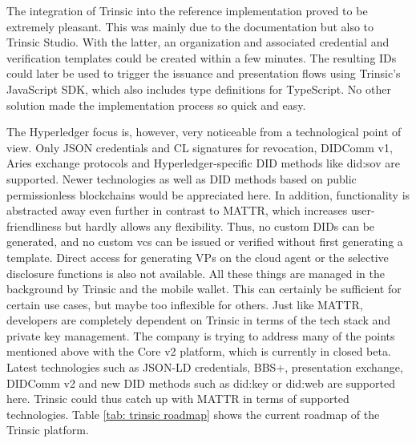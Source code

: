     The integration of Trinsic into the reference implementation proved to be extremely pleasant. This was mainly due to the documentation but also to Trinsic Studio. With the latter, an organization and associated credential and verification templates could be created within a few minutes. The resulting IDs could later be used to trigger the issuance and presentation flows using Trinsic's JavaScript SDK, which also includes type definitions for TypeScript. No other solution made the implementation process so quick and easy.
    
    The Hyperledger focus is, however, very noticeable from a technological point of view. Only JSON credentials and CL signatures for revocation, DIDComm v1, Aries exchange protocols and Hyperledger-specific DID methods like did:sov are supported. Newer technologies as well as DID methods based on public permissionless blockchains would be appreciated here. In addition, functionality is abstracted away even further in contrast to MATTR, which increases user-friendliness but hardly allows any flexibility. Thus, no custom \acp{DID} can be generated, and no custom \acp{vc} can be issued or verified without first generating a template. Direct access for generating \acp{VP} on the cloud agent or the selective disclosure functions is also not available. All these things are managed in the background by Trinsic and the mobile wallet. This can certainly be sufficient for certain use cases, but maybe too inflexible for others. Just like MATTR, developers are completely dependent on Trinsic in terms of the tech stack and private key management. The company is trying to address many of the points mentioned above with the Core v2 platform, which is currently in closed beta. Latest technologies such as JSON-LD credentials, BBS+, presentation exchange, DIDComm v2 and new DID methods such as did:key or did:web are supported here. Trinsic could thus catch up with MATTR in terms of supported technologies. Table \ref{tab: trinsic roadmap} shows the current roadmap of the Trinsic platform.
    
